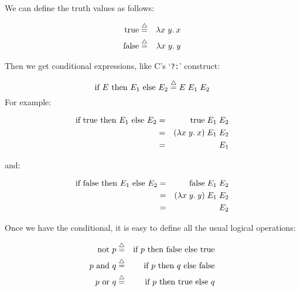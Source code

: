 \begin{slide*}


\vspace*{0.5cm}

We can define the truth values as follows:

\begin{red}
\begin{eqnarray*}
\mbox{true} & \stackrel{\bigtriangleup}{=} & \lambda x\; y.\: x                   \\
\mbox{false} & \stackrel{\bigtriangleup}{=} & \lambda x\; y.\: y
\end{eqnarray*}
\end{red}
Then we get conditional expressions, like C's `{\tt ?:}' construct:

{\red $$ \mbox{if } E \mbox{ then } E_1 \mbox{ else } E_2 \stackrel{\bigtriangleup}{=} E\; E_1\; E_2
$$}
For example:

\begin{red}
\begin{eqnarray*}
\mbox{if } \mbox{true} \mbox{ then } E_1 \mbox{ else } E_2
  & = & \mbox{true}\; E_1\; E_2                 \\
  & = & (\lambda x\; y.\: x)\; E_1\; E_2            \\
  & = & E_1
\end{eqnarray*}
\end{red}

\end{slide*}


\begin{slide*}


\vspace*{0.5cm}

and:

\begin{red}
\begin{eqnarray*}
\mbox{if } \mbox{false} \mbox{ then } E_1 \mbox{ else } E_2
  & = & \mbox{false}\; E_1\; E_2                \\
  & = & (\lambda x\; y.\: y)\; E_1\; E_2            \\
  & = & E_2
\end{eqnarray*}
\end{red}
Once we have the conditional, it is easy to define all the usual
logical operations:

\begin{red}
\begin{eqnarray*}
\mbox{not } p  & \stackrel{\bigtriangleup}{=} & \mbox{if } p \mbox{ then false else true}          \\
p \mbox{ and } q & \stackrel{\bigtriangleup}{=} & \mbox{if } p \mbox{ then } q \mbox{ else false}  \\
p \mbox{ or } q & \stackrel{\bigtriangleup}{=} & \mbox{if } p \mbox{ then true else } q            \\
\end{eqnarray*}
\end{red}

\end{slide*}


